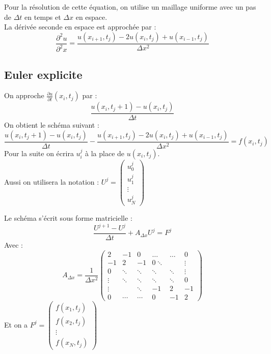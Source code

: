 \documentclass[a4paper,12pt,twoside]{report}
\begin{document}
Pour la résolution de cette équation, on utilise un maillage uniforme avec un pas de $\Delta t$ en temps et $\Delta x$ en espace. \\
La dérivée seconde en espace est approchée par : 
\begin{equation}
\frac{\partial ^2u}{\partial ^2x} = \frac{u(x_{i+1},t_j) - 2u(x_i,t_j) + u(x_{i-1},t_j)}{\Delta x^2}
\end{equation}

\subsection{Euler explicite}

On approche $\frac{\partial u}{\partial t}(x_i,t_j)$ par :
\begin{equation}
\frac{u(x_i,t_j+1) - u(x_i,t_j)}{\Delta t}
\end{equation}
On obtient le schéma suivant :\\
\begin{equation}
\frac{u(x_i,t_j+1) - u(x_i,t_j)}{\Delta t} - \frac{u(x_{i+1},t_j) - 2u(x_i,t_j) + u(x_{i-1},t_j)}{\Delta x^2} = f(x_i,t_j)
\end{equation}
Pour la suite on écrira $u^j_i$ à la place de $u(x_i,t_j)$. \\ 
Aussi on utilisera la notation :
$U^j = \left( \begin{array}{c}
u^j_0\\
u^j_1 \\
\vdots \\
u^j_N
\end{array} \right)$

Le schéma s'écrit sous forme matricielle :
\begin{equation}
\frac{U^{j+1}-U^j}{\Delta t} + A_{\Delta x}U^j = F^j
\end{equation}
Avec :
\begin{equation}
A_{\Delta x} = \frac{1}{\Delta x^2}
\begin{pmatrix}
   2 & -1 & 0 & \ldots & \ldots & 0\\
   -1 & 2 & -1 & 0 \ddots & & \vdots \\
   0 & \ddots & \ddots & \ddots & \ddots & \vdots\\
   \vdots & \ddots & \ddots & \ddots &\ddots & 0\\
   \vdots & & \ddots & -1 & 2 & -1\\
   0 & \cdots & \cdots & 0 & -1 & 2
\end{pmatrix}
\end{equation}
Et on a $F^j = \left( \begin{array}{c}
f(x_1,t_j)\\
f(x_2,t_j) \\
\vdots \\
f(x_N,t_j)
\end{array} \right)$
\end{document}
